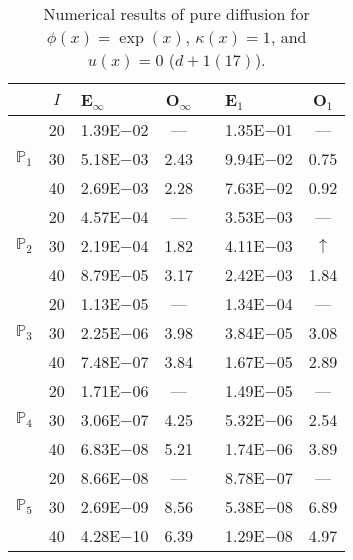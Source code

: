 \begin{table}[H]
\centering
\caption{Numerical results of pure diffusion for $\phi(x)=\exp(x)$, $\kappa(x)=1$, and $u(x)=0$ ($d+1 (17)$).}
\begin{tabular}{@{}l c l c c l c@{}}
\toprule
 & $I$ & E$_{\infty}$ & O$_{\infty}$ && E$_1$ & O$_1$\\
\midrule
\multirow{3}{*}{$\mathbb{P}_{1}$}
 & 20 & 1.39E$-$02 & --- && 1.35E$-$01 & ---\\
 & 30 & 5.18E$-$03 & 2.43 && 9.94E$-$02 & 0.75\\
 & 40 & 2.69E$-$03 & 2.28 && 7.63E$-$02 & 0.92\\
\midrule
\multirow{3}{*}{$\mathbb{P}_{2}$}
 & 20 & 4.57E$-$04 & --- && 3.53E$-$03 & ---\\
 & 30 & 2.19E$-$04 & 1.82 && 4.11E$-$03 & $\uparrow$\\
 & 40 & 8.79E$-$05 & 3.17 && 2.42E$-$03 & 1.84\\
\midrule
\multirow{3}{*}{$\mathbb{P}_{3}$}
 & 20 & 1.13E$-$05 & --- && 1.34E$-$04 & ---\\
 & 30 & 2.25E$-$06 & 3.98 && 3.84E$-$05 & 3.08\\
 & 40 & 7.48E$-$07 & 3.84 && 1.67E$-$05 & 2.89\\
\midrule
\multirow{3}{*}{$\mathbb{P}_{4}$}
 & 20 & 1.71E$-$06 & --- && 1.49E$-$05 & ---\\
 & 30 & 3.06E$-$07 & 4.25 && 5.32E$-$06 & 2.54\\
 & 40 & 6.83E$-$08 & 5.21 && 1.74E$-$06 & 3.89\\
\midrule
\multirow{3}{*}{$\mathbb{P}_{5}$}
 & 20 & 8.66E$-$08 & --- && 8.78E$-$07 & ---\\
 & 30 & 2.69E$-$09 & 8.56 && 5.38E$-$08 & 6.89\\
 & 40 & 4.28E$-$10 & 6.39 && 1.29E$-$08 & 4.97\\
\bottomrule
\end{tabular}
\end{table}